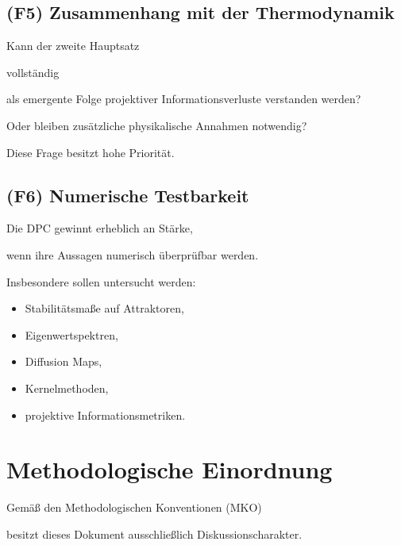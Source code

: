 \documentclass[11pt,a4paper]{article}
\begin{document}

\subsection*{(F5) Zusammenhang mit der Thermodynamik}

Kann der zweite Hauptsatz

vollständig

als emergente Folge projektiver
Informationsverluste verstanden werden?

Oder bleiben zusätzliche physikalische
Annahmen notwendig?

Diese Frage besitzt hohe Priorität.


\subsection*{(F6) Numerische Testbarkeit}

Die DPC gewinnt erheblich an Stärke,

wenn ihre Aussagen numerisch überprüfbar werden.

Insbesondere sollen untersucht werden:

\begin{itemize}

\item Stabilitätsmaße auf Attraktoren,

\item Eigenwertspektren,

\item Diffusion Maps,

\item Kernelmethoden,

\item projektive Informationsmetriken.

\end{itemize}

\section{Methodologische Einordnung}

Gemäß den Methodologischen Konventionen (MKO)

besitzt dieses Dokument ausschließlich
Diskussionscharakter.
\end{document}
